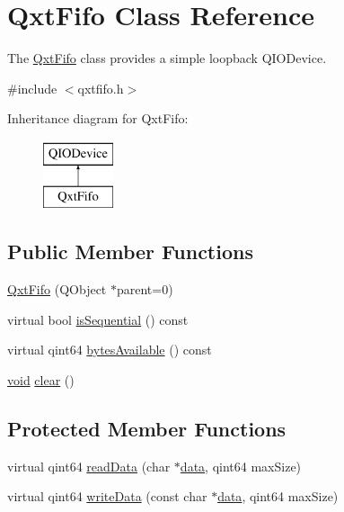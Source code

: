 \hypertarget{class_qxt_fifo}{\section{Qxt\-Fifo Class Reference}
\label{class_qxt_fifo}
}


The \hyperlink{class_qxt_fifo}{Qxt\-Fifo} class provides a simple loopback Q\-I\-O\-Device.  




{\ttfamily \#include $<$qxtfifo.\-h$>$}

Inheritance diagram for Qxt\-Fifo\-:\begin{figure}[H]
\begin{center}
\leavevmode
\includegraphics[height=2.000000cm]{class_qxt_fifo}
\end{center}
\end{figure}
\subsection*{Public Member Functions}
\begin{DoxyCompactItemize}
\item 
\hyperlink{class_qxt_fifo_a96294419092fb30bd70f1bcefb316f84}{Qxt\-Fifo} (Q\-Object $\ast$parent=0)
\item 
virtual bool \hyperlink{class_qxt_fifo_a92171eccf06fe541f445e8876de692f7}{is\-Sequential} () const 
\item 
virtual qint64 \hyperlink{class_qxt_fifo_aae4a82e79fb35db776e9579c2e6c8dee}{bytes\-Available} () const 
\item 
\hyperlink{group___u_a_v_objects_plugin_ga444cf2ff3f0ecbe028adce838d373f5c}{void} \hyperlink{class_qxt_fifo_a9df8163b0a3d85519da7f53f8b43f4a6}{clear} ()
\end{DoxyCompactItemize}
\subsection*{Protected Member Functions}
\begin{DoxyCompactItemize}
\item 
virtual qint64 \hyperlink{class_qxt_fifo_a8be3d72f758b7405afd2162239249ff6}{read\-Data} (char $\ast$\hyperlink{glext_8h_a8850df0785e6fbcc2351af3b686b8c7a}{data}, qint64 max\-Size)
\item 
virtual qint64 \hyperlink{class_qxt_fifo_a478916f30700c98a7a341b6a27081d08}{write\-Data} (const char $\ast$\hyperlink{glext_8h_a8850df0785e6fbcc2351af3b686b8c7a}{data}, qint64 max\-Size)
\end{DoxyCompactItemize}


